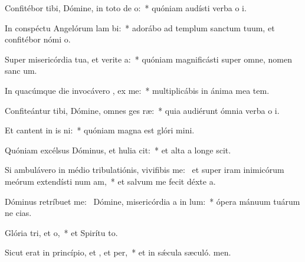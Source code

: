 \item Confitébor tibi, Dómine, in toto de o:~* quóniam audísti verba o i.
\item In conspéctu Angelórum lam bi:~* adorábo ad templum sanctum tuum, et confitébor nómi o.
\item Super misericórdia tua, et verite a:~* quóniam magnificásti super omne, nomen sanc um.
\item In quacúmque die invocávero , ex me:~* multiplicábis in ánima mea tem.
\item Confiteántur tibi, Dómine, omnes ges ræ:~* quia audiérunt ómnia verba o i.
\item Et cantent in is ni:~* quóniam magna est glóri mini.
\item Quóniam excélsus Dóminus, et hulia cit:~* et alta a longe scit.
\item Si ambulávero in médio tribulatiónis, vivifibis me:~\pscross{} et super iram inimicórum meórum extendísti num am,~* et salvum me fecit déxte a.
\item Dóminus retríbuet  me:~\pscross{} Dómine, misericórdia a in lum:~* ópera mánuum tuárum ne cias.
\item Glória tri, et o,~* et Spirítu to.
\item Sicut erat in princípio, et , et per,~* et in sǽcula sæculó. men.
